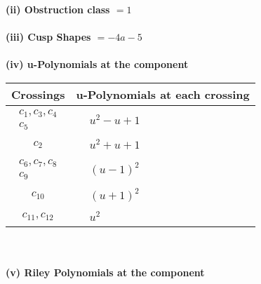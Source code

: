 \documentclass[1p]{elsarticle_modified}
\theoremstyle{definition}
\begin{document}
\flushleft \textbf{(ii) Obstruction class $= 1$}\\~\\
\flushleft \textbf{(iii) Cusp Shapes $= -4 a-5$}\\~\\
\newpage\renewcommand{\arraystretch}{1}
\flushleft \textbf{(iv) u-Polynomials at the component}\newline \\
\begin{tabular}{m{50pt}|m{274pt}}
Crossings & \hspace{64pt}u-Polynomials at each crossing \\
\hline $$\begin{aligned}c_{1},c_{3},c_{4}\\c_{5}\end{aligned}$$&$\begin{aligned}
&u^2- u+1
\end{aligned}$\\
\hline $$\begin{aligned}c_{2}\end{aligned}$$&$\begin{aligned}
&u^2+u+1
\end{aligned}$\\
\hline $$\begin{aligned}c_{6},c_{7},c_{8}\\c_{9}\end{aligned}$$&$\begin{aligned}
&(u-1)^2
\end{aligned}$\\
\hline $$\begin{aligned}c_{10}\end{aligned}$$&$\begin{aligned}
&(u+1)^2
\end{aligned}$\\
\hline $$\begin{aligned}c_{11},c_{12}\end{aligned}$$&$\begin{aligned}
&u^2
\end{aligned}$\\
\hline
\end{tabular}\\~\\
\newpage\renewcommand{\arraystretch}{1}
\flushleft \textbf{(v) Riley Polynomials at the component}\newline \\
\end{document}
